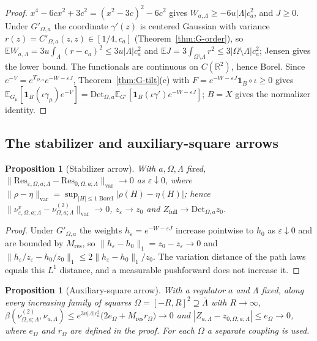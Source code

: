 \documentclass[11pt]{article}
\theoremstyle{plain}
\newtheorem{proposition}[theorem]{Proposition}
\theoremstyle{definition}
\theoremstyle{remark}
\newcommand{\R}{\mathbb{R}}
\newcommand{\E}{\mathbb{E}}
\newcommand{\ind}{\mathbf{1}}
\newcommand{\Res}{\mathrm{Res}}
\newcommand{\Det}{\mathrm{Det}}
\begin{document}
\begin{proof}
$x^{4}-6cx^{2}+3c^{2}=(x^{2}-3c)^{2}-6c^{2}$ gives $W_{a,\Lambda}\ge-6u|\Lambda|c_a^{2}$, and
$J\ge0$. Under $G'_{\Omega,a}$ the coordinate $\gamma'(z)$ is centered Gaussian with
variance $r(z)=C'_{\Omega,a}(z,z)\in[1/4,c_a]$ (Theorem~\ref{thm:G-order}), so
$\E W_{a,\Lambda}=3u\int_\Lambda(r-c_a)^{2}\le3u|\Lambda|c_a^{2}$ and
$\E J=3\int_{\Omega\setminus\Lambda}r^{2}\le3|\Omega\setminus\Lambda|c_a^{2}$; Jensen gives the lower
bound. The functionals are continuous on $C(\R^{2})$, hence Borel. Since
$e^{-V}=e^{T_{\Omega,a}}e^{-W-\varepsilon J}$, Theorem~\ref{thm:G-tilt}(c) with
$F=e^{-W-\varepsilon J}\ind_B\circ\iota\ge0$ gives
$\E_{G_\mu}[\ind_B(\iota\gamma_\mu)e^{-V}]=\Det_{\Omega,a}\E_{G'}[\ind_B(\iota\gamma')e^{-W-\varepsilon J}]$;
$B=X$ gives the normalizer identity.
\end{proof}

\subsection{The stabilizer and auxiliary-square arrows}

\begin{proposition}[Stabilizer arrow]\label{prop:stab}
With $a,\Omega,\Lambda$ fixed, $\|\Res_{\varepsilon,\Omega,a;\Lambda}-\Res_{0,\Omega,a;\Lambda}\|_{\mathrm{var}}\to0$ as
$\varepsilon\downarrow0$, where $\|\rho-\eta\|_{\mathrm{var}}=\sup_{|H|\le1\text{ Borel}}|\rho(H)-\eta(H)|$; hence
$\|\nu^{v}_{\varepsilon,\Omega,a;\Lambda}-\nu^{(2)}_{\Omega,a;\Lambda}\|_{\mathrm{var}}\to0$,
$z_\varepsilon\to z_0$ and $Z_{\mathrm{full}}\to\Det_{\Omega,a}z_0$.
\end{proposition}

\begin{proof}
Under $G'_{\Omega,a}$ the weights $h_\varepsilon=e^{-W-\varepsilon J}$ increase pointwise to $h_0$ as
$\varepsilon\downarrow0$ and are bounded by $M_{\mathrm{res}}$, so
$\|h_\varepsilon-h_0\|_1=z_0-z_\varepsilon\to0$ and
$\|h_\varepsilon/z_\varepsilon-h_0/z_0\|_1\le2\|h_\varepsilon-h_0\|_1/z_0$. The variation distance of the path
laws equals this $L^{1}$ distance, and a measurable pushforward does not increase
it.
\end{proof}

\begin{proposition}[Auxiliary-square arrow]\label{prop:aux}
With a regulator $a$ and $\Lambda$ fixed, along every increasing family of squares
$\Omega=[-R,R]^{2}\supseteq\bar\Lambda$ with $R\to\infty$,
$\beta(\nu^{(2)}_{\Omega,a;\Lambda},\nu_{a,\Lambda})\le e^{3u|\Lambda|c_a^{2}}\bigl(2e_\Omega+M_{\mathrm{res}}r_\Omega\bigr)\to0$
and $|Z_{a,\Lambda}-z_{0,\Omega,a;\Lambda}|\le e_\Omega\to0$, where $e_\Omega$ and $r_\Omega$ are defined in
the proof. For each $\Omega$ a separate coupling is used.
\end{proposition}
\end{document}

